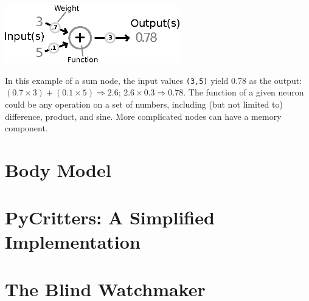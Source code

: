 \documentclass[10pt]{book}
\begin{document}
\beforefig
\centerline{\includegraphics[width=3in]{./pycritters_figs/Neuron.eps}}
\afterfig

In this example of a sum node, the input values {\tt (3,5)} yield 0.78 as the output: 
$(0.7\times 3)+(0.1\times 5) \Rightarrow 2.6$; $2.6 \times 0.3 \Rightarrow 0.78$. 
The function of a given neuron could be any operation on a set of numbers, including 
(but not limited to) difference, product, and sine. More complicated nodes can 
have a memory component. %




\section{Body Model}



\section{PyCritters: A Simplified Implementation}


\section{The Blind Watchmaker}

\end{document}
